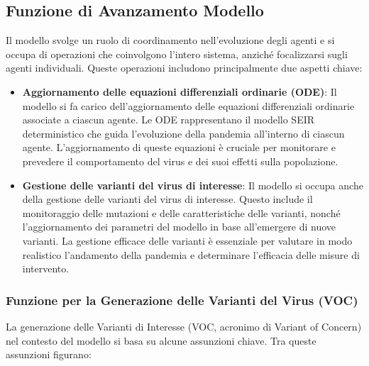 \newpage

\subsection{Funzione di Avanzamento Modello}

Il modello svolge un ruolo di coordinamento nell'evoluzione degli agenti 
e si occupa di operazioni che coinvolgono l'intero sistema, 
anziché focalizzarsi sugli agenti individuali. 
Queste operazioni includono principalmente due aspetti chiave:

\begin{itemize}
	\item \textbf{Aggiornamento delle equazioni differenziali 
	ordinarie (ODE)}: Il modello si fa carico dell'aggiornamento 
	delle equazioni differenziali ordinarie associate a ciascun agente. 
	Le ODE rappresentano il modello SEIR deterministico che guida 
	l'evoluzione della pandemia all'interno di ciascun agente. 
	L'aggiornamento di queste equazioni è cruciale per monitorare e 
	prevedere il comportamento del virus e dei suoi effetti sulla 
	popolazione.
	\item \textbf{Gestione delle varianti del virus di interesse}: Il 
	modello si occupa anche della gestione delle varianti del virus 
	di interesse. Questo include il monitoraggio delle mutazioni e 
	delle caratteristiche delle varianti, nonché l'aggiornamento dei 
	parametri del modello in base all'emergere di nuove varianti. 
	La gestione efficace delle varianti è essenziale per valutare in 
	modo realistico l'andamento della pandemia e determinare 
	l'efficacia delle misure di intervento.
\end{itemize}

\subsubsection{Funzione per la Generazione delle Varianti del Virus (VOC)}

La generazione delle Varianti di Interesse 
(VOC, acronimo di Variant of Concern) nel contesto del modello si 
basa su alcune assunzioni chiave. Tra queste assunzioni figurano:

